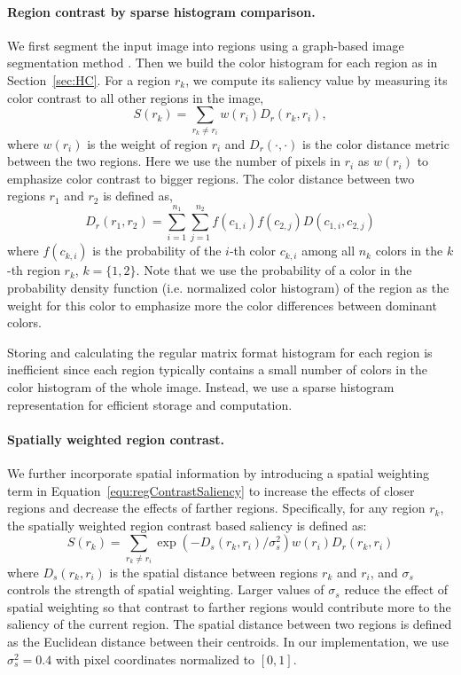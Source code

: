 \documentclass[10pt,twocolumn,letterpaper]{article}
\newcommand{\equref}[1]{Equation~\ref{#1}}
\newcommand{\secref}[1]{Section~\ref{#1}}
\newcommand{\vnudge}{\vspace*{-.1in}}
\newcommand{\mypara}[1]{\paragraph{#1.}}
\begin{document}
\vnudge
\mypara{Region contrast by sparse histogram comparison}
We first segment the input image into regions using a graph-based image segmentation
method \cite{04ijcv/felzenszwalb_efficient}.
%
Then we build the color histogram for each region as in \secref{sec:HC}.
%
For a region $r_k$, we compute its saliency value by measuring its color contrast to all other
regions in the image,
\begin{equation}\label{equ:regContrastSaliency}
    S(r_k) = \sum_{r_k \neq r_i} w(r_i)  D_r(r_k, r_i),
\end{equation}
where $w(r_i)$ is the weight of region $r_i$ and $D_r(\cdot, \cdot)$ is the color distance metric
between the two regions.
%
Here we use the number of pixels in $r_i$ as $w(r_i)$ to emphasize color contrast to bigger regions.
%
The color distance between two regions $r_1$ and $r_2$ is defined as,
\begin{equation}\label{equ:regContrast}
    D_r(r_1, r_2) = \sum_{i=1}^{n_1} \sum_{j=1}^{n_2} f(c_{1,i}) f(c_{2,j}) D(c_{1,i}, c_{2,j})
\end{equation}
where $f(c_{k,i})$ is the probability of the $i$-th color $c_{k,i}$ among all $n_k$ colors in the
$k$-th
 region $r_k$, $k=\{1,2\}$.
%
%
Note that we use the probability of a color in the probability density function (i.e. normalized color histogram) of the region as the weight for this color to emphasize more the color differences between dominant colors.


Storing and calculating the regular matrix format histogram for each region is inefficient since
each region typically contains a small number of colors in the color histogram of the whole image.
%
Instead, we use a sparse histogram representation for efficient storage and computation.


\vnudge
\mypara{Spatially weighted region contrast} We further incorporate spatial information by
introducing a spatial weighting term in \equref{equ:regContrastSaliency}   to increase the effects
of closer regions and decrease the effects of farther regions.
%
Specifically, for any region $r_k$, the spatially weighted region contrast based saliency is
defined as:
\begin{equation}\label{equ:regContrastSpatial}
    S(r_k) =  \sum_{r_k \neq r_i} \exp({-D_s(r_k, r_i)/\sigma_s^2})  w(r_i)  D_r(r_k, r_i)
\end{equation}
where $D_s(r_k, r_i)$ is the spatial distance between regions $r_k$ and $r_i$, and $\sigma_s$
controls the strength of spatial weighting.
%
Larger values of $\sigma_s$ reduce the effect of spatial weighting
so that contrast to farther regions would contribute more to the saliency of the current region.
%
The spatial distance between two regions is defined as the Euclidean distance between their
centroids. In our implementation, we use $\sigma_s^2 = 0.4$ with pixel
coordinates normalized to $[0, 1]$.
\end{document}
